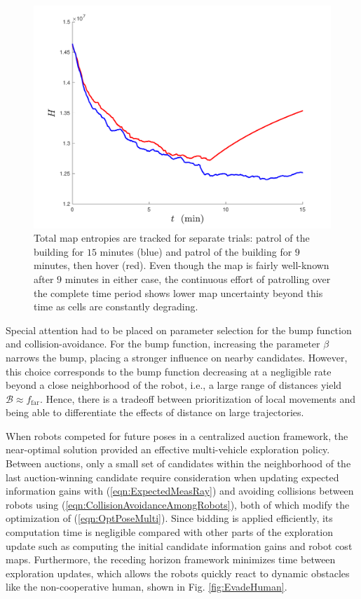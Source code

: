 \documentclass[smallextended]{svjour3}       %
\newcommand{\refeqn}[1]{(\ref{eqn:#1})}
\begin{document}
\begin{figure}
\centering
\includegraphics[width=\textwidth]{entropy_patrol_9minSwitch.pdf}
\caption{Total map entropies are tracked for separate trials: patrol of the building for $15$ minutes (blue) and patrol of the building for $9$ minutes, then hover (red). Even though the map is fairly well-known after $9$ minutes in either case, the continuous effort of patrolling over the complete time period shows lower map uncertainty beyond this time as cells are constantly degrading.}
\label{fig:DegradeExamples}
\end{figure}

Special attention had to be placed on parameter selection for the bump function and collision-avoidance. For the bump function, increasing the parameter $\beta$ narrows the bump, placing a stronger influence on nearby candidates. However, this choice corresponds to the bump function decreasing at a negligible rate beyond a close neighborhood of the robot, i.e., a large range of distances yield $\mathcal B\approx f_\text{far}$. Hence, there is a tradeoff between prioritization of local movements and being able to differentiate the effects of distance on large trajectories.

When robots competed for future poses in a centralized auction framework, the near-optimal solution provided an effective multi-vehicle exploration policy. Between auctions, only a small set of candidates within the neighborhood of the last auction-winning candidate require consideration when updating expected information gains with \refeqn{ExpectedMeasRay} and avoiding collisions between robots using \refeqn{CollisionAvoidanceAmongRobots}, both of which modify the optimization of \refeqn{OptPoseMulti}. Since bidding is applied efficiently, its computation time is negligible compared with other parts of the exploration update such as computing the initial candidate information gains and robot cost maps. Furthermore, the receding horizon framework minimizes time between exploration updates, which allows the robots quickly react to dynamic obstacles like the non-cooperative human, shown in Fig. \ref{fig:EvadeHuman}.
\end{document}
